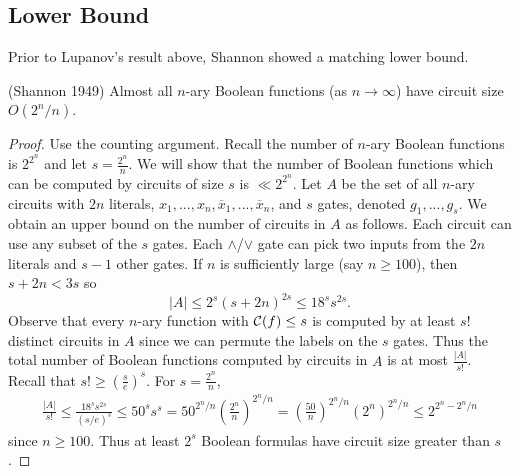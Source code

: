 \documentclass[11pt]{article}
\begin{document}
\subsection{Lower Bound}
\label{ssec:circuitsizelowerbd}
Prior to Lupanov's result above, Shannon showed a matching lower bound. 
\begin{theorem}
	(Shannon 1949) Almost all $n$-ary Boolean functions (as $n \rightarrow \infty$) have circuit size $O(2^n/n)$.
\end{theorem}
\begin{proof}
	Use the counting argument. Recall the number of $n$-ary Boolean functions is $2^{2^{n}}$ and let $s = \frac{2^n}{n}$. We will show that the number of Boolean functions which can be computed by circuits of size $s$ is $\ll 2^{2^{n}}$. Let $A$ be the set of all $n$-ary circuits with $2n$ literals, $x_1, ..., x_n, \overline{x}_1, ..., \overline{x}_n$, and $s$ gates, denoted $g_1, ..., g_s$. We obtain an upper bound on the number of circuits in $A$ as follows. Each circuit can use any subset of the $s$ gates. Each $\land$/$\lor$ gate can pick two inputs from the $2n$ literals and $s-1$ other gates. If $n$ is sufficiently large (say $n \geq 100$), then $s + 2n < 3s$ so
	\[|A| \leq 2^s(s + 2n)^{2s} \leq 18^ss^{2s}.\] 
	Observe that every $n$-ary function with $\operatorname*{\mathcal{C}}(f) \leq s$ is computed by at least $s!$ distinct circuits in $A$ since we can permute the labels on the $s$ gates. Thus the total number of Boolean functions computed by circuits in $A$ is at most $\frac{|A|}{s!}$. Recall that $s! \geq \left(\frac{s}{e}\right)^s$. For $s = \frac{2^n}{n}$,
	\begin{align*}
		\frac{|A|}{s!} \leq \frac{18^ss^{2s}}{\left(s/e\right)^s} \leq 50^s s^{s} = 50^{2^n/n}\left(\frac{2^n}{n}\right)^{2^{n}/n} = \left(\frac{50}{n}\right)^{2^n/n}\left(2^{n}\right)^{2^{n}/n} \leq 2^{2^n-2^n/n}
	\end{align*}
	since $n \geq 100$. Thus at least $2^{s}$ Boolean formulas have circuit size greater than $s$.
\end{proof}
\end{document}

